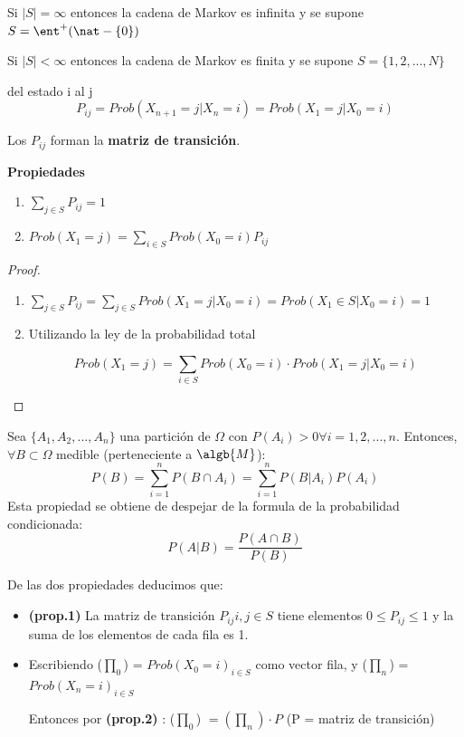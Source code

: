 Si $|S| = \infty$ entonces la cadena de Markov es infinita y se supone $S = \ent^+ (\nat -\{0\})$


Si $|S| < \infty$ entonces la cadena de Markov es finita y se supone $S =\{1,2,...,N\}$

\begin{defn}
	del estado i al j
	$$P_{ij} = Prob(X_{n+1} = j| X_n = i) = Prob (X_1 = j| X_0 = i)$$
\end{defn}

Los $P_{ij}$ forman la \textbf{matriz de transición}.

\newpage
\textbf{Propiedades}
\begin{enumerate}
	\item $\sum_{j \in S} P_{ij} = 1$
	\item $Prob(X_1 = j)= \sum_{i \in S} Prob(X_0 = i)P_{ij}$\\
\end{enumerate}

\begin{proof}
	\begin{enumerate}
		\item $\sum_{j \in S} P_{ij} = \sum_{j\in S} Prob(X_1 = j | X_0 = i) = Prob (X_1 \in S | X_0 = i) = 1$
		\item Utilizando la ley de la probabilidad total

		$$Prob(X_1 = j) = \sum_{i \in S} Prob (X_0 = i) \cdot Prob(X_1 = j| X_0 = i)$$
	\end{enumerate}
\end{proof}

	\begin{defn}
		Sea  $\{A_1, A_2,...,A_n\}$ una partición de $\Omega$ con $P(A_i)>0 \forall i=1,2,...,n$. Entonces, $\forall B \subset \Omega$ medible (perteneciente a $\algb{M}$):
		\[
		P(B)=\sum_{i=1}^{n}P(B\cap A_i)=\sum_{i=1}^{n}P(B|A_i)P(A_i)
		\]
		Esta propiedad se obtiene de despejar de la formula de la probabilidad condicionada:
		\[P(A|B)=\frac{P(A \cap B)}{P(B)}\]
	\end{defn}


De las dos propiedades deducimos que:
\begin{itemize}
	\item \textbf{(prop.1)} La matriz de transición $P_{ij} i,j \in S$ tiene elementos $0 \leq P_{ij} \leq 1$ y la suma de los elementos de cada fila es 1.
	\item Escribiendo ($\prod_0$) = ${Prob (X_0 =i)}_{i \in S}$ como vector fila, y ($\prod_n$) = ${Prob (X_n =i)}_{i \in S}$

	Entonces por \textbf{(prop.2)} : ($\prod_0$) $ = (\prod_n)\cdot P$ (P = matriz de transición)
\end{itemize}

